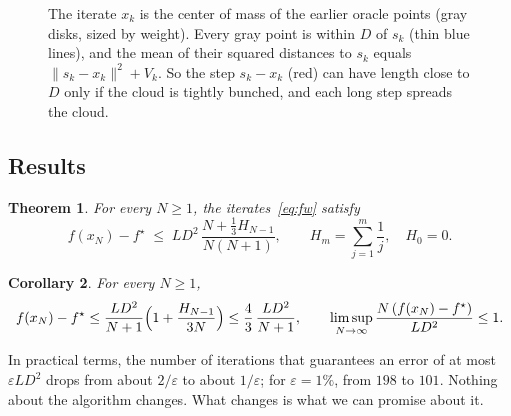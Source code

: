 \documentclass[11pt]{article}
\newtheorem{theorem}{Theorem}
\newtheorem{corollary}[theorem]{Corollary}
\theoremstyle{remark}
\begin{document}
\begin{figure}[htbp]
\centering
{}
\caption{The iterate $x_k$ is the center of mass of the earlier oracle points
(gray disks, sized by weight). Every gray point is within $D$ of $s_k$ (thin blue
lines), and the mean of their squared distances to $s_k$ equals
$\|s_k-x_k\|^2+V_k$. So the step $s_k-x_k$ (red) can have length close to $D$ only
if the cloud is tightly bunched, and each long step spreads the cloud.}
\label{fig:cloud}
\end{figure}

\subsection{Results}

\begin{theorem}\label{thm:main}
For every $N\ge1$, the iterates~\eqref{eq:fw} satisfy
\[
  f(x_N)-f^\star \;\le\; LD^2\,\frac{N+\frac13 H_{N-1}}{N(N+1)},\qquad
  H_m=\sum_{j=1}^m\frac1j,\quad H_0=0.
\]
\end{theorem}

\begin{corollary}\label{cor:simple}
For every $N\ge1$,
\[
  f(x_N)-f^\star\le\frac{LD^2}{N+1}\Bigl(1+\frac{H_{N-1}}{3N}\Bigr)\le\frac43\,\frac{LD^2}{N+1},
  \qquad
  \limsup_{N\to\infty}\frac{N\,(f(x_N)-f^\star)}{LD^2}\le1.
\]
\end{corollary}

In practical terms, the number of iterations that guarantees an error of at most
$\varepsilon LD^2$ drops from about $2/\varepsilon$ to about $1/\varepsilon$; for
$\varepsilon=1\%$, from $198$ to $101$. Nothing about the algorithm changes. What
changes is what we can promise about it.
\end{document}

